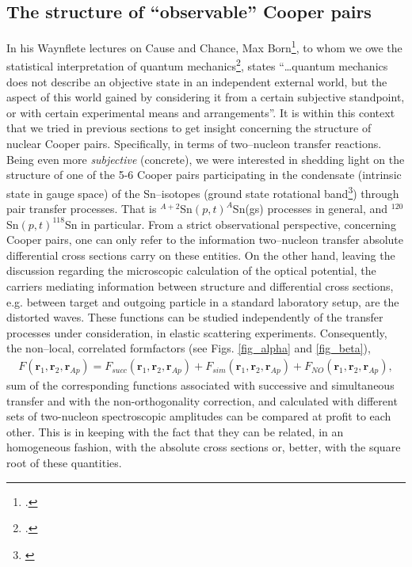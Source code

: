 \subsection{The structure of ``observable'' Cooper pairs}\label{S6.5.4}
In his Waynflete lectures on Cause and Chance, Max Born\footnote{\cite{Born:48}.}, to whom we owe the statistical interpretation of quantum mechanics\footnote{\cite{Born:64,Pais:86}.}, states ``\dots quantum mechanics does not describe an objective state in an independent external world, but the aspect of this world gained by considering it from a certain subjective standpoint, or with certain experimental means and arrangements''. It is within this context that we tried in previous sections to get insight concerning the structure of nuclear Cooper pairs. Specifically, in terms of two--nucleon transfer reactions. Being even more \textit{subjective} (concrete), we were interested in shedding light on the structure of one of the 5-6 Cooper pairs participating in the condensate (intrinsic state in gauge space) of the Sn--isotopes (ground state rotational band\footnote{\cite{Potel:13b,Potel:17}}) through pair transfer processes. That is $^{A+2}$Sn$(p,t)^{A}$Sn(gs) processes in general, and $^{120}$Sn$(p,t)^{118}$Sn in particular. From a strict observational perspective, concerning Cooper pairs, one can only refer to the information two--nucleon transfer absolute differential cross sections carry on these entities. On the other hand, leaving the discussion regarding the microscopic calculation of the optical potential, the carriers mediating information between structure and differential cross sections, e.g. between target and outgoing particle in a standard laboratory setup, are the distorted waves. These functions can be studied independently of the transfer processes under consideration, in elastic scattering experiments. Consequently, the non--local, correlated formfactors (see Figs. \ref{fig_alpha} and \ref{fig_beta}),
\begin{align}\label{eq6.6.1}
F(\mathbf r_1,\mathbf r_2,\mathbf r_{Ap})=F_{succ}(\mathbf r_1,\mathbf r_2,\mathbf r_{Ap})+F_{sim}(\mathbf r_1,\mathbf r_2,\mathbf r_{Ap})+F_{NO}(\mathbf r_1,\mathbf r_2,\mathbf r_{Ap}),
\end{align}
sum of the corresponding functions associated with successive and simultaneous transfer  and with the non-orthogonality correction, and calculated with different sets of two-nucleon spectroscopic amplitudes can be compared at profit to each other. This is in keeping with the fact that they can be related, in an homogeneous fashion, with the absolute cross sections or, better, with the square root of these quantities. 

